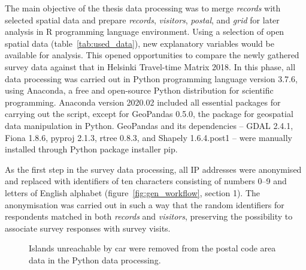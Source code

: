 The main objective of the thesis data processing was to merge \textit{records} with selected spatial data and prepare \textit{records},  \textit{visitors}, \textit{postal}, and \textit{grid} for later analysis in R programming language environment. Using a selection of open spatial data (table~\ref{tab:used_data}), new explanatory variables would be available for analysis. This opened opportunities to compare the newly gathered survey data against that in Helsinki Travel-time Matrix 2018. In this phase, all data processing was carried out in Python programming language version 3.7.6, using Anaconda, a free and open-source Python distribution for scientific programming. Anaconda version 2020.02 included all essential packages for carrying out the script, except for GeoPandas 0.5.0, the package for geospatial data manipulation in Python. GeoPandas and its dependencies -- GDAL 2.4.1, Fiona 1.8.6, pyproj 2.1.3, rtree 0.8.3, and Shapely 1.6.4.post1 -- were manually installed through Python package installer pip.

As the first step in the survey data processing, all IP addresses were anonymised and replaced with identifiers of ten characters consisting of numbers 0--9 and letters of English alphabet (figure~\ref{fig:gen_workflow}, section 1). The anonymisation was carried out in such a way that the random identifiers for respondents matched in both \textit{records} and \textit{visitors}, preserving the possibility to associate survey responses with survey visits. 

\begin{figure}[H]%
    \centering
    \quad
    \caption[Process to remove islands not reachable by car]{Islands unreachable by car were removed from the postal code area data in the Python data processing.}%
    \label{fig:paavo_resarea}%
\end{figure}

